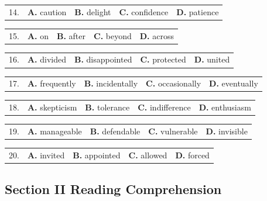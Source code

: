 \documentclass[UTF8,11pt]{ctexart}
\begin{document}
\noindent\begin{tabularx}{\linewidth}{@{}lXXXX@{}}14. & \textbf{A.} caution & \textbf{B.} delight & \textbf{C.} confidence & \textbf{D.} patience\\\end{tabularx}\par

\noindent\begin{tabularx}{\linewidth}{@{}lXXXX@{}}15. & \textbf{A.} on & \textbf{B.} after & \textbf{C.} beyond & \textbf{D.} across\\\end{tabularx}\par

\noindent\begin{tabularx}{\linewidth}{@{}lXXXX@{}}16. & \textbf{A.} divided & \textbf{B.} disappointed & \textbf{C.} protected & \textbf{D.} united\\\end{tabularx}\par

\noindent\begin{tabularx}{\linewidth}{@{}lXXXX@{}}17. & \textbf{A.} frequently & \textbf{B.} incidentally & \textbf{C.} occasionally & \textbf{D.} eventually\\\end{tabularx}\par

\noindent\begin{tabularx}{\linewidth}{@{}lXXXX@{}}18. & \textbf{A.} skepticism & \textbf{B.} tolerance & \textbf{C.} indifference & \textbf{D.} enthusiasm\\\end{tabularx}\par

\noindent\begin{tabularx}{\linewidth}{@{}lXXXX@{}}19. & \textbf{A.} manageable & \textbf{B.} defendable & \textbf{C.} vulnerable & \textbf{D.} invisible\\\end{tabularx}\par

\noindent\begin{tabularx}{\linewidth}{@{}lXXXX@{}}20. & \textbf{A.} invited & \textbf{B.} appointed & \textbf{C.} allowed & \textbf{D.} forced\\\end{tabularx}\par

\subsection*{\textbf{Section II Reading Comprehension}}
\end{document}
